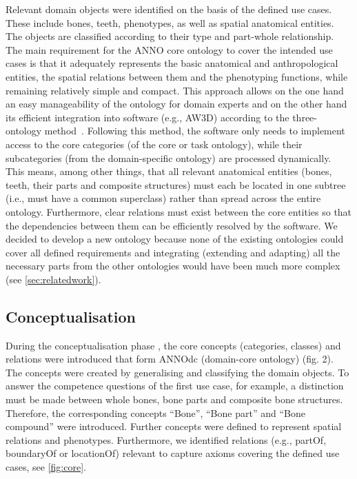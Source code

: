 \documentclass[sw]{iosart2x}
\begin{document}
Relevant domain objects were identified on the basis of the defined use cases.
These include bones, teeth, phenotypes, as well as spatial anatomical entities.
The objects are classified according to their type and part-whole relationship.
The main requirement for the ANNO core ontology to cover the intended use cases is that it adequately represents the basic anatomical and anthropological entities, the spatial relations between them and the phenotyping functions, while remaining relatively simple and compact.
This approach allows on the one hand an easy manageability of the ontology for domain experts and on the other hand its efficient integration into software (e.g., AW3D) according to the three-ontology method~\citep{threeontologymethod}. 
Following this method, the software only needs to implement access to the core categories (of the core or task ontology), while their subcategories (from the domain-specific ontology) are processed dynamically.
This means, among other things, that all relevant anatomical entities (bones, teeth, their parts and composite structures) must each be located in one subtree (i.e., must have a common superclass) rather than spread across the entire ontology.
Furthermore, clear relations must exist between the core entities so that the dependencies between them can be efficiently resolved by the software.
We decided to develop a new ontology because none of the existing ontologies could cover all defined requirements and integrating (extending and adapting) all the necessary parts from the other ontologies would have been much more complex (see \cref{sec:relatedwork}). 

\subsection{Conceptualisation}

During the conceptualisation phase \citep{herre2010}, the core concepts (categories, classes) and relations were introduced that form ANNOdc (domain-core ontology) (fig. 2).
The concepts were created by generalising and classifying the domain objects.
To answer the competence questions of the first use case, for example, a distinction must be made between whole bones, bone parts and composite bone structures.
Therefore, the corresponding concepts \enquote{Bone}, \enquote{Bone part} and \enquote{Bone compound} were introduced.
Further concepts were defined to represent spatial relations and phenotypes.
Furthermore, we identified relations (e.g., partOf, boundaryOf or locationOf) relevant to capture axioms covering the defined use cases, see \cref{fig:core}.
\end{document}
